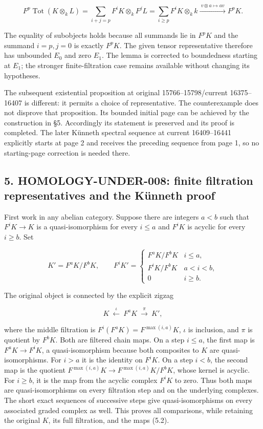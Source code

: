 \documentclass[11pt]{article}
\begin{document}
\[
F^p\operatorname{Tot}(K\otimes_k L)
=\sum_{i+j=p}F^iK\otimes_k F^jL
=\sum_{i\geq p}F^iK\otimes_k k
\xrightarrow{\ v\otimes a\mapsto av\ }F^pK.
\]

The equality of subobjects holds because all summands lie in \(F^pK\) and the summand \(i=p,j=0\) is exactly \(F^pK\). The given tensor representative therefore has unbounded \(E_0\) and zero \(E_1\). The lemma is corrected to boundedness starting at \(E_1\); the stronger finite-filtration case remains available without changing its hypotheses.

The subsequent existential proposition at original 15766--15798/current 16375--16407 is different: it permits a choice of representative. The counterexample does not disprove that proposition. Its bounded initial page can be achieved by the construction in §5. Accordingly its statement is preserved and its proof is completed. The later Künneth spectral sequence at current 16409--16441 explicitly starts at page 2 and receives the preceding sequence from page 1, so no starting-page correction is needed there.

\subsection{5. HOMOLOGY-UNDER-008: finite filtration representatives and the Künneth proof}\label{note-07-homology-under-008-finite-filtration-representatives-and-the-kuxfcnneth-proof}

First work in any abelian category. Suppose there are integers \(a<b\) such that \(F^iK\to K\) is a quasi-isomorphism for every \(i\leq a\) and \(F^iK\) is acyclic for every \(i\geq b\). Set

\[
K'=F^aK/F^bK,
\qquad
F^iK'=
\begin{cases}
F^aK/F^bK&i\leq a,\\
F^iK/F^bK&a<i<b,\\
0&i\geq b.
\end{cases}                                  \tag{5.1}
\]

The original object is connected by the explicit zigzag

\[
K\ \xleftarrow{\iota}\ F^aK\ \xrightarrow{\pi}\ K',       \tag{5.2}
\]

where the middle filtration is \(F^i(F^aK)=F^{\max(i,a)}K\), \(\iota\) is inclusion, and \(\pi\) is quotient by \(F^bK\). Both are filtered chain maps. On a step \(i\leq a\), the first map is \(F^aK\to F^iK\), a quasi-isomorphism because both composites to \(K\) are quasi-isomorphisms. For \(i>a\) it is the identity on \(F^iK\). On a step \(i<b\), the second map is the quotient \(F^{\max(i,a)}K\to F^{\max(i,a)}K/F^bK\), whose kernel is acyclic. For \(i\geq b\), it is the map from the acyclic complex \(F^iK\) to zero. Thus both maps are quasi-isomorphisms on every filtration step and on the underlying complexes. The short exact sequences of successive steps give quasi-isomorphisms on every associated graded complex as well. This proves all comparisons, while retaining the original \(K\), its full filtration, and the maps (5.2).
\end{document}
